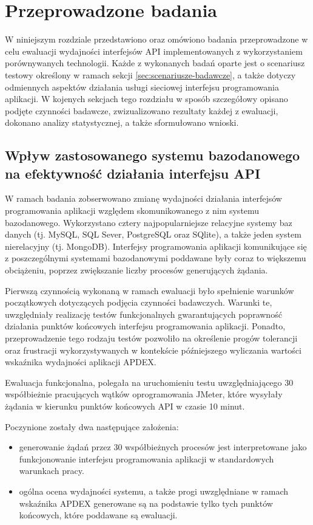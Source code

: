 \chapter{Przeprowadzone badania}
W niniejszym rozdziale przedstawiono oraz omówiono badania przeprowadzone w celu ewaluacji wydajności interfejsów API implementowanych z wykorzystaniem porównywanych technologii. Każde z wykonanych badań oparte jest o scenariusz testowy określony w ramach sekcji \ref{sec:scenariusze-badawcze}, a także dotyczy odmiennych aspektów działania usługi sieciowej interfejsu programowania aplikacji. W kojenych sekcjach tego rozdziału w sposób szczegółowy opisano podjęte czynności badawcze, zwizualizowano rezultaty każdej z ewaluacji, dokonano analizy statystycznej, a także sformułowano wnioski.

\section{Wpływ zastosowanego systemu bazodanowego na efektywność działania interfejsu API}
\label{research:crud}
W ramach badania zobserwowano zmianę wydajności działania interfejsów programowania aplikacji względem skomunikowanego z nim systemu bazodanowego. Wykorzystano cztery najpopularniejsze relacyjne systemy baz danych (tj. MySQL, SQL Sever, PostgreSQL oraz SQlite), a także jeden system nierelacyjny (tj. MongoDB). Interfejsy programowania aplikacji komunikujące się z poszczególnymi systemami bazodanowymi poddawane były coraz to większemu obciążeniu, poprzez zwiększanie liczby procesów generujących żądania.

Pierwszą czynnością wykonaną w ramach ewaluacji było spełnienie warunków początkowych dotyczących podjęcia czynności badawczych. Warunki te, uwzględniały realizację testów funkcjonalnych gwarantujących poprawność działania punktów końcowych interfejsu programowania aplikacji. Ponadto, przeprowadzenie tego rodzaju testów pozwoliło na określenie progów tolerancji oraz frustracji wykorzystywanych w kontekście późniejszego wyliczania wartości wskaźnika wydajności aplikacji APDEX.

Ewaluacja funkcjonalna, polegała na uruchomieniu testu uwzględniającego 30 współbieżnie pracujących wątków oprogramowania JMeter, które wysyłały żądania w kierunku punktów końcowych API w czasie 10 minut.

Poczynione zostały dwa następujące założenia:
\begin{itemize}
    \item generowanie żądań przez 30 współbieżnych procesów jest interpretowane jako funkcjonowanie interfejsu programowania aplikacji w standardowych warunkach pracy.
    \item ogólna ocena wydajności systemu, a także progi uwzględniane w ramach wskaźnika APDEX generowane są na podstawie tylko tych punktów końcowych, które poddawane są ewaluacji.
\end{itemize}


